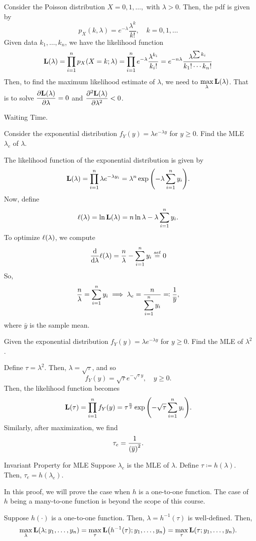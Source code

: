 \begin{eg}
	Consider the Poisson distribution $X=0,1,\dots,$ with $\lambda>0$. Then, the pdf is given by \[p_X(k,\lambda)=e^{-\lambda}\dfrac{\lambda^k}{k!},\quad k=0,1,\dots\] Given data $k_1,\dots,k_n$, we have the likelihood function \[\vb{L}(\lambda)=\prod_{i=1}^np_X\qty(X=k;\lambda)=\prod_{i=1}^ne^{-\lambda}\dfrac{\lambda^{k_i}}{k_i!}=e^{-n\lambda}\dfrac{\lambda^{\sum{k_i}}}{k_1!\cdots k_n!}\] Then, to find the maximum likelihood estimate of $\lambda$, we need to $\displaystyle\max_{\lambda}\vb{L}(\lambda)$. That is to solve $\displaystyle\pdv{\vb{L}(\lambda)}{\lambda}=0$ and $\displaystyle\pdv[2]{\vb{L}(\lambda)}{\lambda}<0$.
\end{eg}
\begin{eg}
	Waiting Time. \par 
	Consider the exponential distribution $f_Y(y)=\lambda e^{-\lambda y}$ for $y\geq 0$. Find the MLE $\lambda_e$ of $\lambda$.
	\begin{sol}
		The likelihood function of the exponential distribution is given by
		\[\vb{L}(\lambda)=\prod_{i=1}^n\lambda e^{-\lambda y_i}=\lambda^n\exp\qty(-\lambda\sum_{i=1}^ny_i).\] Now, define \[\ell(\lambda)=\ln\vb{L}(\lambda)=n\ln\lambda-\lambda\sum_{i=1}^ny_i.\] To optimize $\ell(\lambda)$, we compute \[\dv{\lambda}\ell(\lambda)=\dfrac{n}{\lambda}-\sum_{i=1}^ny_i\stackrel{set}{=}0\] So, \[\dfrac{n}{\lambda}=\sum_{i=1}^ny_i\implies\lambda_e=\dfrac{n}{\displaystyle\sum_{i=1}^ny_i}\eqqcolon\dfrac{1}{\overline{y}},\] where $\bar{y}$ is the sample mean. 
	\end{sol}
\end{eg}
\begin{eg}
	Given the exponential distribution $f_Y(y)=\lambda e^{-\lambda y}$ for $y\geq0$. Find the MLE of $\lambda^2$.
	\begin{sol}
		Define $\tau=\lambda^2$. Then, $\lambda=\sqrt{\tau}$, and so \[f_Y(y)=\sqrt{\tau}e^{-\sqrt{\tau}y},\quad y\geq0.\] Then, the likelihood function becomes \[\vb{L}(\tau)=\prod_{i=1}^nf_Y(y)=\tau^{\frac{n}{2}}\exp\qty(-\sqrt{\tau}\sum_{i=1}^ny_i).\] Similarly, after maximization, we find \[\tau_e=\dfrac{1}{\qty(\overline{y})^2}.\]
	\end{sol}
\end{eg}
\begin{thm}{Invariant Property for MLE}
	Suppose $\lambda_e$	is the MLE of $\lambda$. Define $\tau\coloneqq h(\lambda)$. Then, $\tau_e=h(\lambda_e)$.
\end{thm}
\begin{prf}
	In this proof, we will prove the case when $h$ is a one-to-one function. The case of $h$ being a many-to-one function is beyond the scope of this course. \par 
	Suppose $h(\cdot)$ is a one-to-one function. Then, $\lambda=h^{-1}(\tau)$ is well-defined. Then, \[\max_{\lambda}\vb{L}(\lambda;y_1,\dots,y_n)=\max_{\tau}\vb{L}\qty(h^{-1}(\tau);y_1,\dots,y_n)=\max_{\tau}\vb{L}(\tau;y_1,\dots,y_n).\]	
\end{prf}
